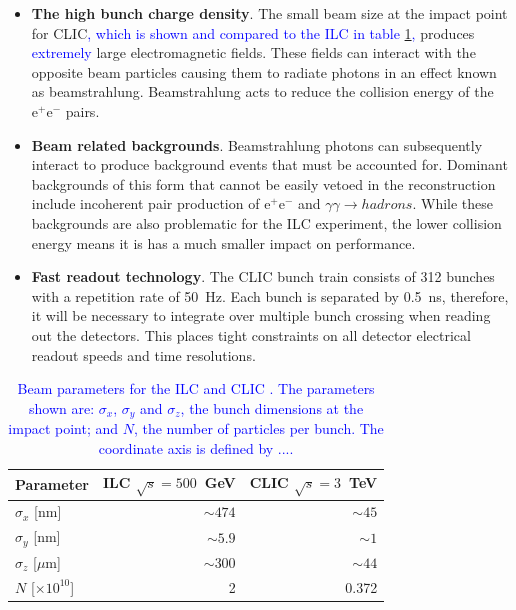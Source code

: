 \begin{itemize}
\item \textbf{The high bunch charge density}.  The small beam size at the impact point for CLIC\textcolor{blue}{, which is shown and compared to the ILC in table \ref{table:clicbeam},} produces \textcolor{blue}{extremely} large electromagnetic fields.  These fields can interact with the opposite beam particles causing them to radiate photons in an effect known as beamstrahlung.  Beamstrahlung acts to reduce the collision energy of the $\text{e}^{+}\text{e}^{-}$ pairs.   
\item \textbf{Beam related backgrounds}.  Beamstrahlung photons can subsequently interact to produce background events that must be accounted for.  Dominant backgrounds of this form that cannot be easily vetoed in the reconstruction include incoherent pair production of $\text{e}^{+}\text{e}^{-}$ and $\gamma\gamma \rightarrow hadrons$.  While these backgrounds are also problematic for the ILC experiment, the lower collision energy means it is has a much smaller impact on performance.
\item \textbf{Fast readout technology}.  The CLIC bunch train consists of 312 bunches with a repetition rate of 50~Hz.  Each bunch is separated by 0.5~ns, therefore, it will be necessary to integrate over multiple bunch crossing when reading out the detectors.  This places tight constraints on all detector electrical readout speeds and time resolutions.   
\end{itemize}

\begin{table}[h!]
\centering
\begin{tabular}{ l r r }
\hline
Parameter & ILC $\sqrt{s} = 500$~GeV & CLIC $\sqrt{s} = 3$~TeV \\
\hline
$\sigma_{x}$ [nm] & $\sim 474$ & $\sim 45$ \\
$\sigma_{y}$ [nm] & $\sim 5.9$ & $\sim 1$ \\
$\sigma_{z}$ [$\mu$m]& $\sim 300$ & $\sim 44$ \\
$N$ [$\times 10^{10}$] & 2 & 0.372 \\
\hline
\end{tabular}
\caption[Beam parameters for the ILC \cite{Behnke:2013xla} and CLIC \cite{Linssen:2012hp}.  The parameters shown are: $\sigma_{x}$, $\sigma_{y}$ and $\sigma_{z}$, the bunch dimensions at the impact point; and $N$, the number of particles per bunch.  The coordinate axis is defined by ....]{\textcolor{blue}{Beam parameters for the ILC \cite{Behnke:2013xla} and CLIC \cite{Linssen:2012hp}.  The parameters shown are: $\sigma_{x}$, $\sigma_{y}$ and $\sigma_{z}$, the bunch dimensions at the impact point; and $N$, the number of particles per bunch.  The coordinate axis is defined by ....}}
\label{table:clicbeam}
\end{table}


